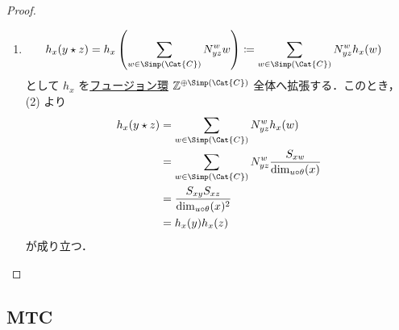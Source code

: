 \documentclass[TQFT_main]{subfiles}
\begin{document}
\begin{proof}
\begin{enumerate}
        　次に，\eqref{eq:thm-S-matrix}の右辺のトレースを計算すると
        \begin{align}
            \Tr (b_{y \otimes z} \circ b_{x,\, y \otimes z})
            &= \sum_{w \in \Simp(\Cat{C})} N^w_{yz} \Tr (b_{w,\, x} \circ b_{x,\, w}) \\
            &= \sum_{w \in \Simp(\Cat{C})} N^w_{yz} S_{xw}
        \end{align}
        となる．よって示された．
        \item 
        \begin{align}
            h_x ( y \star z )
            &= h_x \left( \sum_{w \in \Simp(\Cat{C})} N^w_{yz} w\right) \coloneqq \sum_{w \in \Simp(\Cat{C})} N^w_{yz} h_x (w) 
        \end{align}
        として $h_x$ を\hyperref[eq:fusionring]{フュージョン環} $\mathbb{Z}^{\oplus \Simp(\Cat{C})}$ 全体へ拡張する．このとき，(2) より
        \begin{align}
            h_x (y \star z)
            &= \sum_{w \in \Simp(\Cat{C})} N^w_{yz} h_x (w) \\
            &= \sum_{w \in \Simp(\Cat{C})} N^w_{yz} \frac{S_{xw}}{\dim_{u\circ\theta} (x)} \\
            &= \frac{S_{xy} S_{xz}}{\dim_{u\circ \theta} (x)^2} \\
            &= h_x (y) h_x(z)
        \end{align}
        が成り立つ．
    \end{enumerate}
    
\end{proof}

\subsection{MTC}
\end{document}
